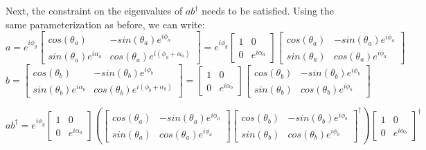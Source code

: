 \documentclass{article}
\begin{document}
Next, the constraint on the eigenvalues of $ab^\dagger$ needs to be satisfied.
Using the same parameterization as before, we can write:
$$a = e^{i\phi_g}\begin{bmatrix}cos(\theta_a)&-sin(\theta_a)e^{i\phi_a}\\
  sin(\theta_a)e^{i\alpha_a}&cos(\theta_a)e^{i(\phi_a + \alpha_a)}\end{bmatrix}
  = e^{i\phi_g}\begin{bmatrix}1&0\\0&e^{i\alpha_a}\end{bmatrix}\begin{bmatrix}
  cos(\theta_a)&-sin(\theta_a)e^{i\phi_a}\\sin(\theta_a)&cos(\theta_a)e^{i\phi_a}\end{bmatrix}$$
$$b = \begin{bmatrix}cos(\theta_b)&-sin(\theta_b)e^{i\phi_b}\\
  sin(\theta_b)e^{i\alpha_b}&cos(\theta_b)e^{i(\phi_b + \alpha_b)}\end{bmatrix}
  = \begin{bmatrix}1&0\\0&e^{i\alpha_b}\end{bmatrix}\begin{bmatrix}cos(\theta_b)
  &-sin(\theta_b)e^{i\phi_b}\\sin(\theta_b)&cos(\theta_b)e^{i\phi_b}\end{bmatrix}$$

$$ab^\dagger = e^{i\phi_g}\begin{bmatrix}1&0\\0&e^{i\alpha_a}\end{bmatrix}\left(
  \begin{bmatrix}cos(\theta_a)&-sin(\theta_a)e^{i\phi_a}\\
  sin(\theta_a)&cos(\theta_a)e^{i\phi_a}\end{bmatrix}\begin{bmatrix}
  cos(\theta_b)&-sin(\theta_b)e^{i\phi_b}\\sin(\theta_b)
  &cos(\theta_b)e^{i\phi_b}\end{bmatrix}^\dagger\right)\begin{bmatrix}1&0\\
  0&e^{i\alpha_b}\end{bmatrix}^\dagger$$
\end{document}
